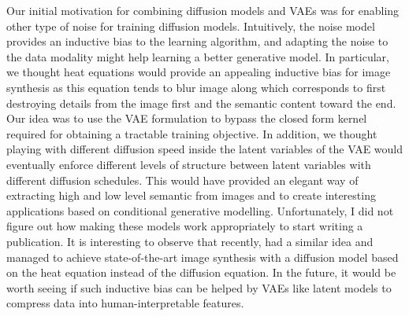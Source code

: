 Our initial motivation for combining diffusion models and VAEs was for enabling other type of noise for training diffusion models. Intuitively, the noise model provides an inductive bias to the learning algorithm, and adapting the noise to the data modality might help learning a better generative model. In particular, we thought heat equations would provide an appealing inductive bias for image synthesis as this equation tends to blur image along which corresponds to first destroying details from the image first and the semantic content toward the end. Our idea was to use the VAE formulation to bypass the closed form kernel required for obtaining a tractable training objective. In addition, we thought playing with different diffusion speed inside the latent variables of the VAE would eventually enforce different levels of structure between latent variables with different diffusion schedules. This would have provided an elegant way of extracting high and low level semantic from images and to create interesting applications based on conditional generative modelling. Unfortunately, I did not figure out how making these models work appropriately to start writing a publication. It is interesting to observe that recently, \citet{rissanen2022generative} had a similar idea and managed to achieve state-of-the-art image synthesis with a diffusion model based on the heat equation instead of the diffusion equation. In the future, it would be worth seeing if such inductive bias can be helped by VAEs like latent models to compress data into human-interpretable features.



